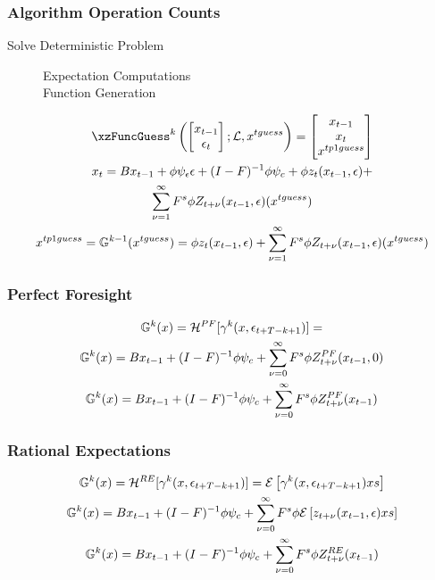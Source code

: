 \documentclass[tikz]{beamer}
\begin{document}
\begin{frame}
  \frametitle{Algorithm Operation Counts}
  \begin{description}
  \item[Solve Deterministic Problem]
    \begin{description}
    \item[Expectation Computations] 
    \item[Function Generation] 
    \end{description}
  \end{description}
\end{frame}




\begin{frame}
  \begin{gather}
  \xzFuncGuess^k \left (
  \begin{bmatrix}
    x_{t-1} \\\epsilon_t
  \end{bmatrix}; \linMod,\xguss
\right )=
  \begin{bmatrix}
    x_{t-1}\\ x_t\\ \xtpguss
  \end{bmatrix}\\
x_t= \sumLinPart + \sumZPartZero +\\  \sumZPartPos(\xguss)\\
\xtpguss=\XZFunc^{k-1}(\xguss) = \sumZPartZero +  \sumZPartPos(\xguss)\label{seriesForm}
  \end{gather}
\end{frame}

\begin{frame}
\frametitle{Perfect Foresight}




\begin{gather}
{\mathbb{G}}^{k}(x)=     \mathcal{H}^{PF}[{{\gamma}}^{k}(x,\epsilon_{t+T-k+1})]=\\
{\mathbb{G}}^{k}(x)={ B x_{t-1}+ (I - F)^{-1} \phi \psi_c } +   { \sum_{{\nu}=0}^\infty F^s \phi Z^{PF}_{t+{\nu}}(x_{t-1},0) }\\
 {\mathbb{G}}^{k}(x)={ B x_{t-1}+ (I - F)^{-1} \phi \psi_c } + { \sum_{{\nu}=0}^\infty F^s \phi {Z^{PF}_{t+{\nu}}(x_{t-1})} }
\end{gather}

\end{frame}
\begin{frame}
  
 \frametitle{Rational Expectations}

 \begin{gather}
 {\mathbb{G}}^{k}(x)=     \mathcal{H}^{RE}[{{\gamma}}^{k}(x,\epsilon_{t+T-k+1})]=
 {\mathcal{E}\left [ {{\gamma}}^{k}(x,\epsilon_{t+T-k+1}) xs\right ]}\\
  {\mathbb{G}}^{k}(x)={ B x_{t-1}+ (I - F)^{-1} \phi \psi_c } + { \sum_{{\nu}=0}^\infty F^s \phi {\mathcal{E}\left [ z_{t+{\nu}}(x_{t-1},\epsilon) xs\right ]} }\\
 {\mathbb{G}}^{k}(x)={ B x_{t-1}+ (I - F)^{-1} \phi \psi_c } + { \sum_{{\nu}=0}^\infty F^s \phi {Z^{RE}_{t+{\nu}}(x_{t-1})} }
 \end{gather}

\end{frame}
\end{document}
